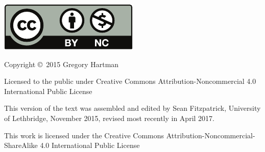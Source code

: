 \noindent\hskip -1in\begin{minipage}{2in}
\includegraphics{text/by-nc} 
\end{minipage}
\begin{minipage}{3in}
\noindent Copyright \copyright\ 2015 Gregory Hartman

Licensed to the public under Creative Commons Attribution-Noncommercial 4.0 International Public License
\end{minipage}

\bigskip

\bigskip



\bigskip

\begin{minipage}{3.3in}
This version of the text was assembled and edited by Sean Fitzpatrick, University of Lethbridge, November 2015, revised most recently in April 2017. 

This work is licensed under the Creative Commons Attribution-Noncommercial-ShareAlike 4.0 International Public License
\end{minipage}
